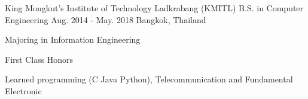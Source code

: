 

\begin{cventries}

    \cventry
    {King Mongkut's Institute of Technology Ladkrabang (KMITL)} %
    {B.S. in Computer Engineering} %
    {Aug. 2014 - May. 2018} %
    {Bangkok, Thailand} %
    {
    \begin{cvitems} %
        \item {Majoring in Information Engineering}
        \item {First Class Honors}
        \item {Learned programming (C Java Python), Telecommunication and Fundamental Electronic}
    \end{cvitems}
    }

\end{cventries}
